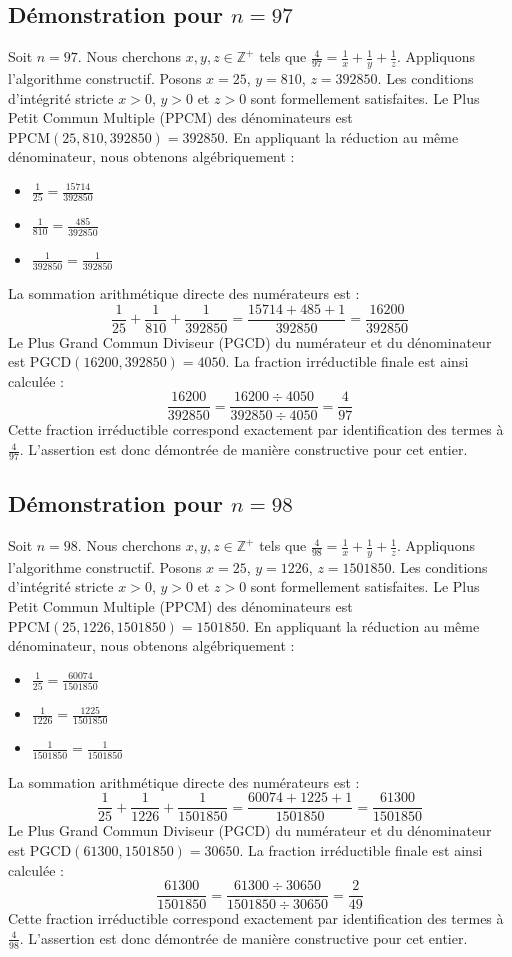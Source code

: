 \documentclass[11pt,a4paper]{article}
\begin{document}
\subsection{Démonstration pour $n = 97$}
Soit $n = 97$. Nous cherchons $x, y, z \in \mathbb{Z}^{+}$ tels que $\frac{4}{97} = \frac{1}{x} + \frac{1}{y} + \frac{1}{z}$.
Appliquons l'algorithme constructif. Posons $x = 25$, $y = 810$, $z = 392850$.
Les conditions d'intégrité stricte $x > 0$, $y > 0$ et $z > 0$ sont formellement satisfaites.
Le Plus Petit Commun Multiple (PPCM) des dénominateurs est $\text{PPCM}(25, 810, 392850) = 392850$.
En appliquant la réduction au même dénominateur, nous obtenons algébriquement :
\begin{itemize}
    \item $\frac{1}{25} = \frac{15714}{392850}$
    \item $\frac{1}{810} = \frac{485}{392850}$
    \item $\frac{1}{392850} = \frac{1}{392850}$
\end{itemize}
La sommation arithmétique directe des numérateurs est :
$$ \frac{1}{25} + \frac{1}{810} + \frac{1}{392850} = \frac{15714 + 485 + 1}{392850} = \frac{16200}{392850} $$
Le Plus Grand Commun Diviseur (PGCD) du numérateur et du dénominateur est $\text{PGCD}(16200, 392850) = 4050$.
La fraction irréductible finale est ainsi calculée :
$$ \frac{16200}{392850} = \frac{16200 \div 4050}{392850 \div 4050} = \frac{4}{97} $$
Cette fraction irréductible correspond exactement par identification des termes à $\frac{4}{97}$. L'assertion est donc démontrée de manière constructive pour cet entier.

\subsection{Démonstration pour $n = 98$}
Soit $n = 98$. Nous cherchons $x, y, z \in \mathbb{Z}^{+}$ tels que $\frac{4}{98} = \frac{1}{x} + \frac{1}{y} + \frac{1}{z}$.
Appliquons l'algorithme constructif. Posons $x = 25$, $y = 1226$, $z = 1501850$.
Les conditions d'intégrité stricte $x > 0$, $y > 0$ et $z > 0$ sont formellement satisfaites.
Le Plus Petit Commun Multiple (PPCM) des dénominateurs est $\text{PPCM}(25, 1226, 1501850) = 1501850$.
En appliquant la réduction au même dénominateur, nous obtenons algébriquement :
\begin{itemize}
    \item $\frac{1}{25} = \frac{60074}{1501850}$
    \item $\frac{1}{1226} = \frac{1225}{1501850}$
    \item $\frac{1}{1501850} = \frac{1}{1501850}$
\end{itemize}
La sommation arithmétique directe des numérateurs est :
$$ \frac{1}{25} + \frac{1}{1226} + \frac{1}{1501850} = \frac{60074 + 1225 + 1}{1501850} = \frac{61300}{1501850} $$
Le Plus Grand Commun Diviseur (PGCD) du numérateur et du dénominateur est $\text{PGCD}(61300, 1501850) = 30650$.
La fraction irréductible finale est ainsi calculée :
$$ \frac{61300}{1501850} = \frac{61300 \div 30650}{1501850 \div 30650} = \frac{2}{49} $$
Cette fraction irréductible correspond exactement par identification des termes à $\frac{4}{98}$. L'assertion est donc démontrée de manière constructive pour cet entier.
\end{document}
